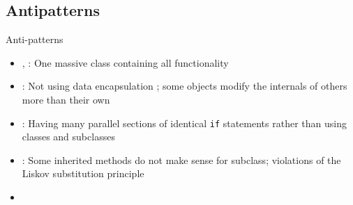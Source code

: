 \subsection{Antipatterns}


\begin{frame}{Anti-patterns}
	\begin{itemize}
		\item {}, : One massive class containing all functionality
		\item {}: Not using data encapsulation ; some objects modify the internals of others more than their own 
		\item {}: Having many parallel sections of identical \texttt{if} statements rather than using classes and subclasses
		\item {}: Some inherited methods do not make sense for subclass; violations of the Liskov substitution principle
		\item {}
	\end{itemize}
\end{frame}